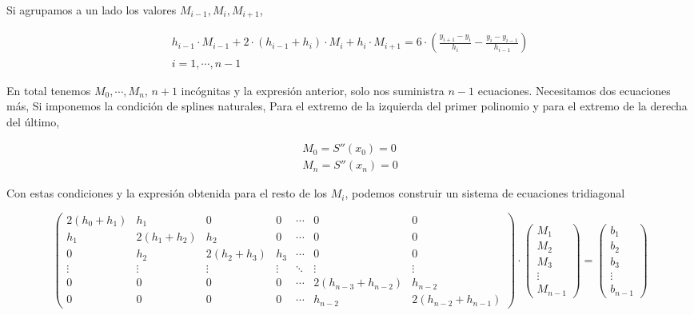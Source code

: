 \begin{paracol}{2}
Si agrupamos a un lado los valores $M_{i-1}, M_i, M_{i+1}$,
\end{paracol}
\begin{align*}
h_{i-1}\cdot M_{i-1}+2\cdot (h_{i-1}+h_i)\cdot M_i+h_i\cdot M_{i+1}=6\cdot \left(\frac{y_{i+1}-y_i}{h_i}-\frac{y_i-y_{i-1}}{h_{i-1}}\right)\\
i=1,\cdots ,n-1
\end{align*}
\begin{paracol}{2}
En total tenemos $M_0,\cdots, M_n$, $n+1$ incógnitas y la expresión anterior, solo nos suministra $n-1$ ecuaciones. Necesitamos dos ecuaciones más, Si imponemos la condición de splines naturales, Para el extremo de la izquierda del primer polinomio y para el extremo de la derecha del último,
\end{paracol}
\begin{align*}
M_0=S''(x_0)=0\\
M_n=S''(x_n)=0
\end{align*}
\begin{paracol}{2}
Con estas condiciones y la expresión obtenida para el resto de los $M_i$, podemos construir un sistema de ecuaciones tridiagonal
\end{paracol}
\begin{equation*}
\begin{pmatrix}
2(h_0+h_1) & h_1 & 0 &0&\cdots &0&0\\
 h_1 & 2(h_1+h_2) & h_2 &0& \cdots&0 & 0\\
0& h_2 & 2(h_2+h_3) & h_3 &\cdots &0& 0\\
\vdots & \vdots & \vdots &\vdots& \ddots & \vdots&\vdots \\
0 & 0 & 0&0&\cdots& 2(h_{n-3}+h_{n-2}) & h_{n-2} \\ 
0 & 0 & 0&0&\cdots&h_{n-2} & 2(h_{n-2}+h_{n-1})
\end{pmatrix}\cdot \begin{pmatrix}
M_1\\
M_2\\
M_3\\
\vdots \\
M_{n-1}
\end{pmatrix}=\begin{pmatrix}
b_1\\
b_2\\
b_3\\
\vdots \\
b_{n-1}
\end{pmatrix}
\end{equation*}
